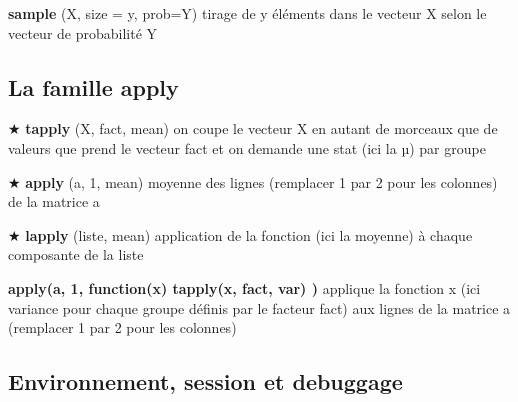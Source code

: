 \documentclass[11, a4paper, landscape]{article}
\newif\ifadvanced
\newcommand{\grasindex}[1]{\textbf{#1} \index{#1\textbf}}
\newcommand{\bu}[0]{\ifadvanced \else \hspace*{-1mm}$\bigstar$ \hspace*{0.15mm}\fi}
\newcommand{\adv}[1]{\ifadvanced #1 \fi}
\begin{document}
\begin{multicols*}{3}
{  \grasindex{sample}(X, size = y, prob=Y)  \quad tirage de y éléments dans le vecteur X selon le vecteur de probabilité Y 
}

\adv{
  \subsection{Autres fonctions pour la programmation}

  \grasindex{parse}(``text'')  \quad transforme un texte en une expression qui n'est pas évaluée 

  \grasindex{deparse}(``text'')  \quad transforme une expression en texte 

  \grasindex{eval}(\textit{expr}, envir=data) \quad  évalue l'expression dans un environnement (ici l'environnement data, souvent un sous forme de dataframe) \textit{e.g.} \textbf{eval(parse}(``text''))  \quad évalue une expression ayant été transformé en texte
}

\subsection{La famille apply}
\adv{ \textit{cf} package \grasindex{dplyr} pour des fonctions plus performantes.
\\
}

\bu\grasindex{tapply}(X, fact, mean)  \quad on coupe le vecteur X en autant de morceaux que de valeurs que prend le vecteur fact et on demande une stat (ici la µ) par groupe

\bu\grasindex{apply}(a, 1, mean)  \quad moyenne des lignes (remplacer 1 par 2 pour les colonnes) de la matrice a

\bu\grasindex{lapply}(liste, mean)  \quad application de la fonction (ici la moyenne) à chaque composante de la liste \adv{df[] <- lapply(liste, mean) stocke les résultats dans le dataframe df}

\textbf{apply(a, 1, function(x) tapply(x, fact, var) )}  \quad applique la fonction x (ici variance pour chaque groupe définis par le facteur fact) aux lignes de la matrice a (remplacer 1 par 2 pour les colonnes) 

\adv{
  \grasindex{sapply} \quad identique à lapply mais retourne un vecteur ou une matrice plutôt qu'une liste. \textit{cf} aussi les fonctions \textbf{mapply} et \textbf{vapply}
}


\subsection{Environnement, session et debuggage}\label{EnvSesDeb}


\end{multicols*}
\end{document}
